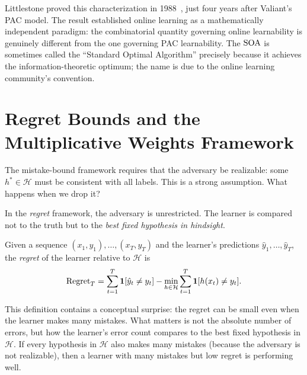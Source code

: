 \begin{historical}
Littlestone proved this characterization in 1988~\cite{Littlestone1988}, just four years after Valiant's PAC model. The result established online learning as a mathematically independent paradigm: the combinatorial quantity governing online learnability is genuinely different from the one governing PAC learnability. The $\operatorname{SOA}$ is sometimes called the ``Standard Optimal Algorithm'' precisely because it achieves the information-theoretic optimum; the name is due to the online learning community's convention.
\end{historical}


\section{Regret Bounds and the Multiplicative Weights Framework}
\label{sec:regret}

The mistake-bound framework requires that the adversary be realizable: some $h^* \in \mathcal{H}$ must be consistent with all labels. This is a strong assumption. What happens when we drop it?

In the \emph{regret} framework, the adversary is unrestricted. The learner is compared not to the truth but to the \emph{best fixed hypothesis in hindsight}.

\begin{defn}[Regret]
\label{def:regret}
Given a sequence $(x_1, y_1), \ldots, (x_T, y_T)$ and the learner's predictions $\hat{y}_1, \ldots, \hat{y}_T$, the \emph{regret} of the learner relative to $\mathcal{H}$ is
\[
\mathrm{Regret}_T = \sum_{t=1}^T \mathbf{1}[\hat{y}_t \neq y_t] - \min_{h \in \mathcal{H}} \sum_{t=1}^T \mathbf{1}[h(x_t) \neq y_t].
\]
\end{defn}

This definition contains a conceptual surprise: the regret can be small even when the learner makes many mistakes. What matters is not the absolute number of errors, but how the learner's error count compares to the best fixed hypothesis in $\mathcal{H}$. If every hypothesis in $\mathcal{H}$ also makes many mistakes (because the adversary is not realizable), then a learner with many mistakes but low regret is performing well.

